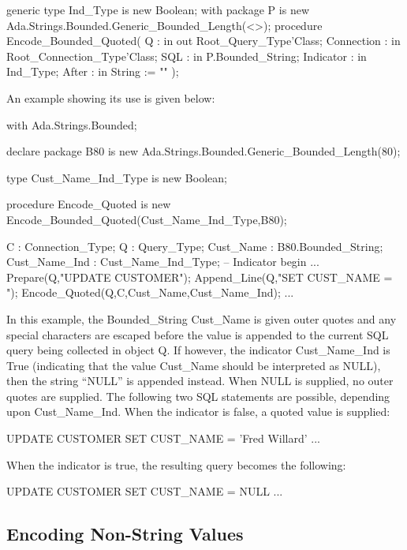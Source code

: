 \documentclass[english,letterpaper]{book}
\begin{document}
\begin{Code}
generic
   type Ind_Type is new Boolean;
   with package P 
      is new Ada.Strings.Bounded.Generic_Bounded_Length(<>);
procedure Encode_Bounded_Quoted(
   Q :          in out Root_Query_Type'Class;
   Connection : in     Root_Connection_Type'Class;
   SQL :        in     P.Bounded_String;
   Indicator :  in     Ind_Type;
   After :      in     String := ""
);
\end{Code}

An example showing its use is given below:

\begin{Example}
with Ada.Strings.Bounded;

declare
   package B80 is new 
      Ada.Strings.Bounded.Generic_Bounded_Length(80);

   type Cust_Name_Ind_Type is new Boolean;

   procedure Encode_Quoted is new
      Encode_Bounded_Quoted(Cust_Name_Ind_Type,B80);

   C :             Connection_Type;
   Q :             Query_Type;
   Cust_Name :     B80.Bounded_String;
   Cust_Name_Ind : Cust_Name_Ind_Type; -- Indicator
begin
   ...
   Prepare(Q,"UPDATE CUSTOMER");
   Append_Line(Q,"SET CUST_NAME = ");
   Encode_Quoted(Q,C,Cust_Name,Cust_Name_Ind);
   ...
\end{Example}

In this example, the Bounded\_String Cust\_Name is given outer
quotes and any special characters are escaped before the value is
appended to the current SQL query being collected in object Q.
If however, the indicator Cust\_Name\_Ind is True (indicating
that the value Cust\_Name should be interpreted as NULL), then
the string ``NULL'' is appended instead. When NULL is supplied,
no outer quotes are supplied. The following two SQL statements are
possible, depending upon Cust\_Name\_Ind. When the indicator is false,
a quoted value is supplied:

\begin{SQL}
UPDATE CUSTOMER
SET CUST_NAME = 'Fred Willard'
...
\end{SQL}

When the indicator is true, the resulting query becomes the following:

\begin{SQL}
UPDATE CUSTOMER
SET CUST_NAME = NULL
...
\end{SQL}

\subsection{Encoding Non-String Values}
\end{document}
